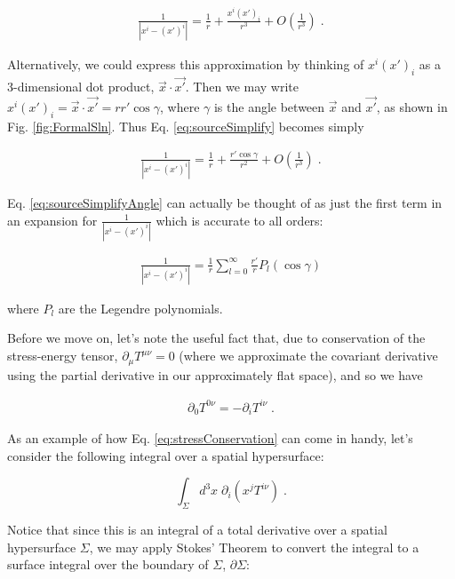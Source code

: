\documentclass[10pt]{article}
\begin{document}
\begin{align}\label{eq:sourceSimplify}
\frac{1}{|x^i-(x')^i|} = \frac{1}{r} + \frac{x^i (x')_i}{r^3} + O\left(\frac{1}{r^3}\right) \; .
\end{align}
                
Alternatively, we could express this approximation by thinking of $x^i (x')_i$ as a 3-dimensional dot product, $\vec{x} \cdot \vec{x'}$. Then we may write $x^i (x')_i = \vec{x} \cdot \vec{x'} = r r' \cos{\gamma}$, where $\gamma$ is the angle between $\vec{x}$ and $\vec{x'}$, as shown in Fig. \ref{fig:FormalSln}. Thus Eq. \ref{eq:sourceSimplify} becomes simply
                
\begin{align}\label{eq:sourceSimplifyAngle}
\frac{1}{|x^i-(x')^i|} = \frac{1}{r} + \frac{r'\cos{\gamma}}{r^2} + O\left(\frac{1}{r^3}\right) \; .
\end{align}
                
Eq. \ref{eq:sourceSimplifyAngle} can actually be thought of as just the first term in an expansion for $\frac{1}{|x^i-(x')^i|}$ which is accurate to all orders:
                
\begin{align}\label{eq:legendre}
\frac{1}{|x^i-(x')^i|} = \frac{1}{r} \sum_{l=0}^{\infty} \frac{r'}{r} P_l(\cos{\gamma})
\end{align}
                
\noindent where $P_l$ are the Legendre polynomials.
                
Before we move on, let's note the useful fact that, due to conservation of the stress-energy tensor, $\partial_\mu T^{\mu\nu}=0$ (where we approximate the covariant derivative using the partial derivative in our approximately flat space), and so we have
                
\begin{align}\label{eq:stressConservation}
\partial_0 T^{0\nu} = -\partial_i T^{i\nu} \; .
\end{align}
                
As an example of how Eq. \ref{eq:stressConservation} can come in handy, let's consider the following integral over a spatial hypersurface:
                
\[ \int_\Sigma d^3 x \; \partial_i (x^j T^{i\nu}) \; .\]
                
 Notice that since this is an integral of a total derivative over a spatial hypersurface $\Sigma$, we may apply Stokes' Theorem to convert the integral to a surface integral over the boundary of $\Sigma$, $\partial\Sigma$:
                
\end{document}
